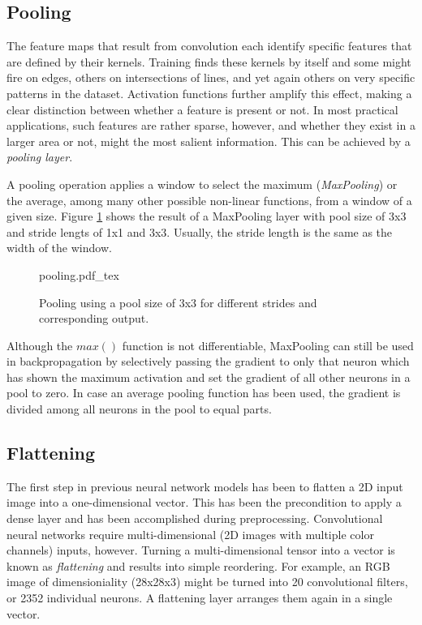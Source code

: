 \subsection{Pooling}

The feature maps that result from convolution each identify specific features that are defined by their kernels. Training finds these kernels by itself and some might fire on edges, others on intersections of lines, and yet again others on very specific patterns in the dataset. Activation functions further amplify this effect, making a clear distinction between whether a feature is present or not. In most practical applications, such features are rather sparse, however, and whether they exist in a larger area or not, might the most salient information. This can be achieved by a \emph{pooling layer}.

A pooling operation applies a window to select the maximum (\emph{MaxPooling}) or the average, among many other possible non-linear functions, from a window of a given size. Figure \ref{fig:pooling} shows the result of a MaxPooling layer with pool size of 3x3 and stride lengts of 1x1 and 3x3. Usually, the stride length is the same as the width of the window.

\begin{figure}[htb]
    \centering
    \def\svgwidth{0.8\textwidth}
    {pooling.pdf_tex}
    \caption{Pooling using a pool size of 3x3 for different strides and corresponding output.\label{fig:pooling}}
\end{figure}

Although the $max()$ function is not differentiable, MaxPooling can still be used in backpropagation by selectively passing the gradient to only that neuron which has shown the maximum activation and set the gradient of all other neurons in a pool to zero. In case an average pooling function has been used, the gradient is divided among all neurons in the pool to equal parts. 

\subsection{Flattening}

The first step in previous neural network models has been to flatten a 2D input image into a one-dimensional vector. This has been the precondition to apply a dense layer and has been accomplished during preprocessing. Convolutional neural networks require multi-dimensional (2D images with multiple color channels) inputs, however. Turning a multi-dimensional tensor into a vector is known as \emph{flattening} and results into simple reordering. For example, an RGB image of dimensioniality (28x28x3) might be turned into 20 convolutional filters, or 2352 individual neurons. A flattening layer arranges them again in a single vector.

